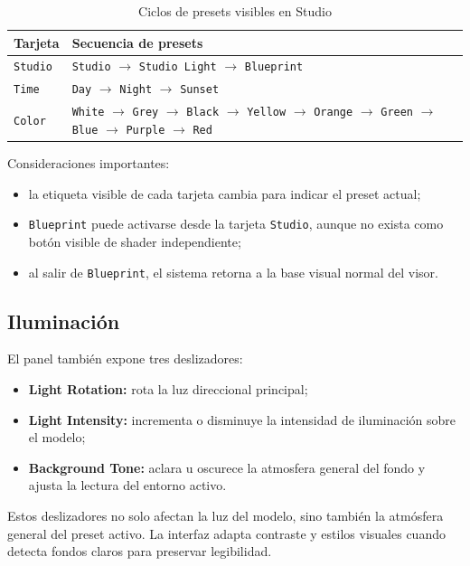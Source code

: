 \documentclass[12pt,letterpaper]{article}
\begin{document}
\begin{table}[htbp!]
\centering
\caption{Ciclos de presets visibles en Studio}
\begin{tabular}{p{3cm}p{10.8cm}}
\toprule
\textbf{Tarjeta} & \textbf{Secuencia de presets} \\
\midrule
\texttt{Studio} & \texttt{Studio} $\rightarrow$ \texttt{Studio Light} $\rightarrow$ \texttt{Blueprint} \\
\texttt{Time} & \texttt{Day} $\rightarrow$ \texttt{Night} $\rightarrow$ \texttt{Sunset} \\
\texttt{Color} & \texttt{White} $\rightarrow$ \texttt{Grey} $\rightarrow$ \texttt{Black} $\rightarrow$ \texttt{Yellow} $\rightarrow$ \texttt{Orange} $\rightarrow$ \texttt{Green} $\rightarrow$ \texttt{Blue} $\rightarrow$ \texttt{Purple} $\rightarrow$ \texttt{Red} \\
\bottomrule
\end{tabular}
\end{table}

\noindent Consideraciones importantes:
\begin{itemize}
    \item la etiqueta visible de cada tarjeta cambia para indicar el preset actual;
    \item \texttt{Blueprint} puede activarse desde la tarjeta \texttt{Studio}, aunque no exista como botón visible de shader independiente;
    \item al salir de \texttt{Blueprint}, el sistema retorna a la base visual normal del visor.
\end{itemize}

\subsection{Iluminación}
El panel también expone tres deslizadores:
\begin{itemize}
    \item \textbf{Light Rotation:} rota la luz direccional principal;
    \item \textbf{Light Intensity:} incrementa o disminuye la intensidad de iluminación sobre el modelo;
    \item \textbf{Background Tone:} aclara u oscurece la atmosfera general del fondo y ajusta la lectura del entorno activo.
\end{itemize}

\noindent Estos deslizadores no solo afectan la luz del modelo, sino también la atmósfera general del preset activo. La interfaz adapta contraste y estilos visuales cuando detecta fondos claros para preservar legibilidad.
\end{document}
